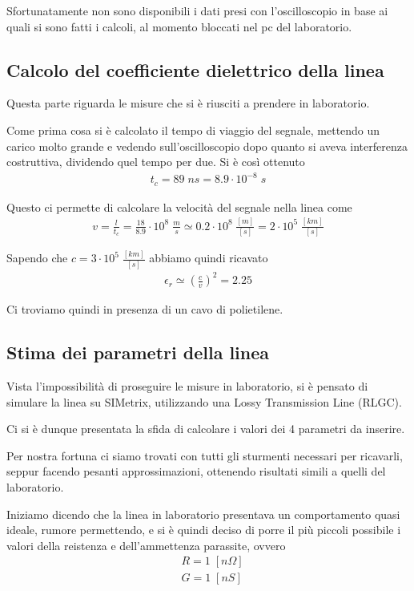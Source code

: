 \documentclass[a4paper,12pt]{report}
\begin{document}
Sfortunatamente non sono disponibili i dati presi con l'oscilloscopio in base ai quali si sono fatti i calcoli, al momento bloccati nel pc del laboratorio.

\subsection{Calcolo del coefficiente dielettrico della linea}

Questa parte riguarda le misure che si è riusciti a prendere in laboratorio.

Come prima cosa si è calcolato il tempo di viaggio del segnale, mettendo un carico molto grande e vedendo sull'oscilloscopio dopo quanto si aveva interferenza costruttiva, dividendo quel tempo per due. Si è così ottenuto
\begin{align}
t_c = 89 \; ns = 8.9 \cdot 10^{-8} \; s
\end{align}

Questo ci permette di calcolare la velocità del segnale nella linea come
\begin{align}
v = \frac{l}{t_c} = \frac{18}{8.9} \cdot  10^{8} \; \frac{m}{s} \simeq 0.2 \cdot 10^{8} \; \frac{[m]}{[s]} = 2 \cdot 10^5 \; \frac{[km]}{[s]}
\end{align}

Sapendo che $c = 3 \cdot 10^5 \; \frac{[km]}{[s]}$ abbiamo quindi ricavato
\begin{align}
\epsilon_r \simeq \left(\frac{c}{v}\right) ^2 = 2.25
\end{align}

Ci troviamo quindi in presenza di un cavo di polietilene.

\subsection{Stima dei parametri della linea}

Vista l'impossibilità di proseguire le misure in laboratorio, si è pensato di simulare la linea su SIMetrix, utilizzando una Lossy Transmission Line (RLGC).

Ci si è dunque presentata la sfida di calcolare i valori dei 4 parametri da inserire.

Per nostra fortuna ci siamo trovati con tutti gli sturmenti necessari per ricavarli, seppur facendo pesanti approssimazioni, ottenendo risultati simili a quelli del laboratorio.

Iniziamo dicendo che la linea in laboratorio presentava un comportamento quasi ideale, rumore permettendo, e si è quindi deciso di porre il più piccoli possibile i valori della reistenza e dell'ammettenza parassite, ovvero
\begin{align}
&R = 1 \; [n\Omega]\\
&G = 1 \; [nS]
\end{align}
\end{document}
